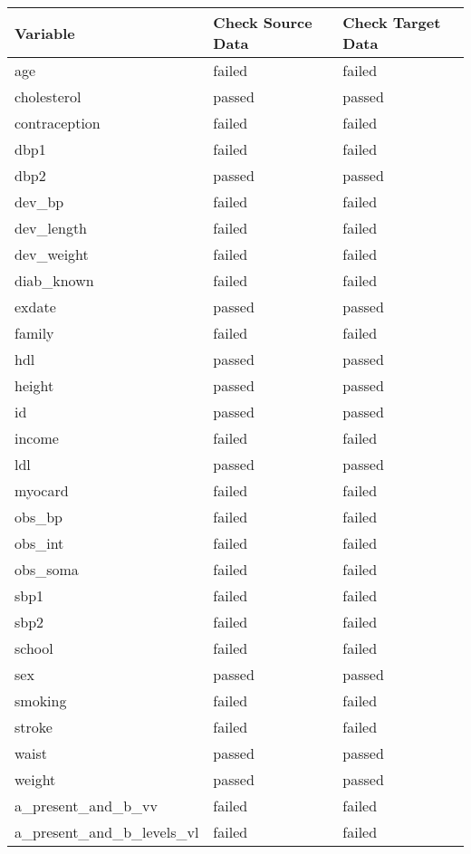 \documentclass[
]{article}
\begin{document}
\begin{table}[H]
\centering
\begin{tabular}{l|l|l}
\hline
\textbf{Variable} & \textbf{Check Source Data} & \textbf{Check Target Data}\\
\hline
age & failed & failed\\
\hline
cholesterol & passed & passed\\
\hline
contraception & failed & failed\\
\hline
dbp1 & failed & failed\\
\hline
dbp2 & passed & passed\\
\hline
dev\_bp & failed & failed\\
\hline
dev\_length & failed & failed\\
\hline
dev\_weight & failed & failed\\
\hline
diab\_known & failed & failed\\
\hline
exdate & passed & passed\\
\hline
family & failed & failed\\
\hline
hdl & passed & passed\\
\hline
height & passed & passed\\
\hline
id & passed & passed\\
\hline
income & failed & failed\\
\hline
ldl & passed & passed\\
\hline
myocard & failed & failed\\
\hline
obs\_bp & failed & failed\\
\hline
obs\_int & failed & failed\\
\hline
obs\_soma & failed & failed\\
\hline
sbp1 & failed & failed\\
\hline
sbp2 & failed & failed\\
\hline
school & failed & failed\\
\hline
sex & passed & passed\\
\hline
smoking & failed & failed\\
\hline
stroke & failed & failed\\
\hline
waist & passed & passed\\
\hline
weight & passed & passed\\
\hline
a\_present\_and\_b\_vv & failed & failed\\
\hline
a\_present\_and\_b\_levels\_vl & failed & failed\\
\hline
\end{tabular}
\end{table}
\end{document}
